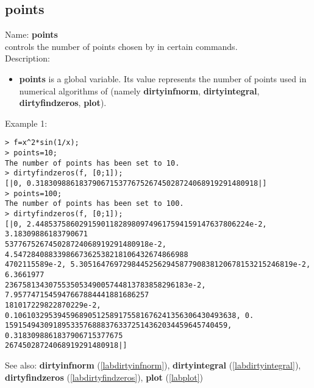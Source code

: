 \subsection{points}
\label{labpoints}
\noindent Name: \textbf{points}\\
controls the number of points chosen by \sollya in certain commands.\\
\noindent Description: \begin{itemize}

\item \textbf{points} is a global variable. Its value represents the number of points
   used in numerical algorithms of \sollya (namely \textbf{dirtyinfnorm},
   \textbf{dirtyintegral}, \textbf{dirtyfindzeros}, \textbf{plot}).
\end{itemize}
\noindent Example 1: 
\begin{center}\begin{minipage}{15cm}\begin{Verbatim}[frame=single]
> f=x^2*sin(1/x);
> points=10;
The number of points has been set to 10.
> dirtyfindzeros(f, [0;1]);
[|0, 0.318309886183790671537767526745028724068919291480918|]
> points=100;
The number of points has been set to 100.
> dirtyfindzeros(f, [0;1]);
[|0, 2.4485375860291590118289809749617594159147637806224e-2, 3.18309886183790671
537767526745028724068919291480918e-2, 4.5472840883398667362538218106432674866988
4702115589e-2, 5.3051647697298445256294587790838120678153215246819e-2, 6.3661977
236758134307553505349005744813783858296183e-2, 7.9577471545947667884441881686257
181017229822870229e-2, 0.106103295394596890512589175581676241356306430493638, 0.
159154943091895335768883763372514362034459645740459, 0.3183098861837906715377675
26745028724068919291480918|]
\end{Verbatim}
\end{minipage}\end{center}
See also: \textbf{dirtyinfnorm} (\ref{labdirtyinfnorm}), \textbf{dirtyintegral} (\ref{labdirtyintegral}), \textbf{dirtyfindzeros} (\ref{labdirtyfindzeros}), \textbf{plot} (\ref{labplot})
